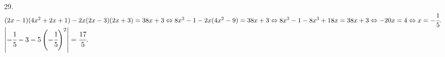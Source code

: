 29. $(2x-1)(4x^2+2x+1)-2x(2x-3)(2x+3)=38x+3\Leftrightarrow8x^3-1-2x(4x^2-9)=38x+3\Leftrightarrow
8x^3-1-8x^3+18x=38x+3\Leftrightarrow-20x=4\Leftrightarrow x=-\cfrac{1}{5}.$\\
$\left|-\cfrac{1}{5}-3-5\left(-\cfrac{1}{5}\right)^2\right|=\cfrac{17}{5}.$\\
